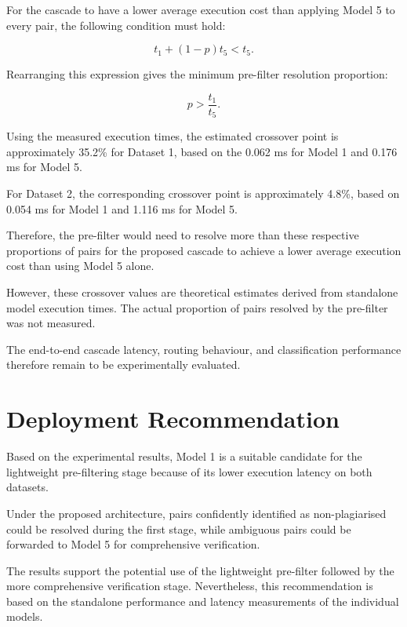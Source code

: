 \documentclass[conference]{IEEEtran}
\begin{document}
For the cascade to have a lower average execution cost
than applying Model 5 to every pair, the following
condition must hold:

\begin{equation}
t_1 + (1-p)t_5 < t_5.
\end{equation}

Rearranging this expression gives the minimum pre-filter
resolution proportion:

\begin{equation}
p > \frac{t_1}{t_5}.
\end{equation}

Using the measured execution times, the estimated crossover
point is approximately 35.2\% for Dataset 1, based on the 0.062 ms
for Model 1 and 0.176 ms for Model 5.

For Dataset 2, the corresponding crossover point is approximately
4.8\%, based on 0.054 ms for Model 1 and 1.116 ms for
Model 5.

Therefore, the pre-filter would need to resolve more than
these respective proportions of pairs for the proposed
cascade to achieve a lower average execution cost than
using Model 5 alone.

However, these crossover values are theoretical estimates
derived from standalone model execution times. The actual
proportion of pairs resolved by the pre-filter was not
measured.

The end-to-end cascade latency, routing behaviour, and
classification performance therefore remain to be
experimentally evaluated.


\section{Deployment Recommendation}

Based on the experimental results, Model 1 is a suitable
candidate for the lightweight pre-filtering stage because
of its lower execution latency on both datasets.

Under the proposed architecture, pairs confidently identified
as non-plagiarised could be resolved during the first stage,
while ambiguous pairs could be forwarded to Model 5 for
comprehensive verification.

The results support the potential use of the lightweight
pre-filter followed by the more comprehensive verification
stage. Nevertheless, this recommendation is based on the
standalone performance and latency measurements of the
individual models.
\end{document}
